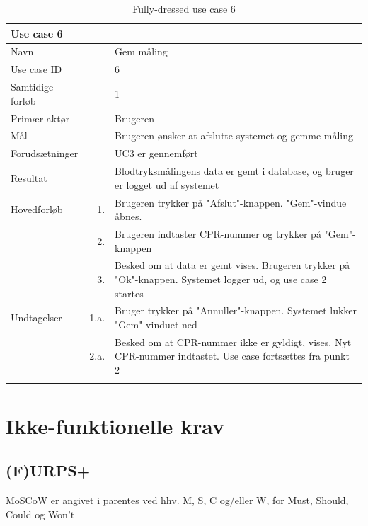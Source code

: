 \begin{longtabu} to  %
    {\large \textbf{Use case 6}} && \\
    \toprule
    Navn &&    Gem måling\\
    Use case ID &&    6\\
    Samtidige forløb &&    1\\
    Primær aktør &&    Brugeren\\
    Mål &&    Brugeren ønsker at afslutte systemet og gemme måling\\
    Forudsætninger && UC3 er gennemført\\
    Resultat &&    Blodtryksmålingens data er gemt i database, og bruger er logget ud af systemet                    \\ \midrule
    Hovedforløb &    1. &    Brugeren trykker på "Afslut"\--knappen. "Gem"\--vindue åbnes. \\  						 	
                &    2. & Brugeren indtaster CPR-nummer og trykker på "Gem"\--knappen \\
                &    3. & Besked om at data er gemt vises. Brugeren trykker på "Ok"\--knappen. Systemet logger ud, og use case 2 startes
                	\\ \midrule                
    Undtagelser &    1.a. & Bruger trykker på "Annuller"\--knappen. Systemet lukker "Gem"\--vinduet ned\\ 
    			&	2.a. &  Besked om at CPR-nummer ikke er gyldigt, vises. Nyt CPR-nummer indtastet. Use case fortsættes fra punkt 2\\ \bottomrule
    		
\caption{Fully-dressed use case 6}
\label{UC6}
\end{longtabu}

\section{Ikke-funktionelle krav}
\subsection{(F)URPS+}
MoSCoW er angivet i parentes ved hhv. M, S, C og/eller W, for Must, Should, Could og Won't\\


